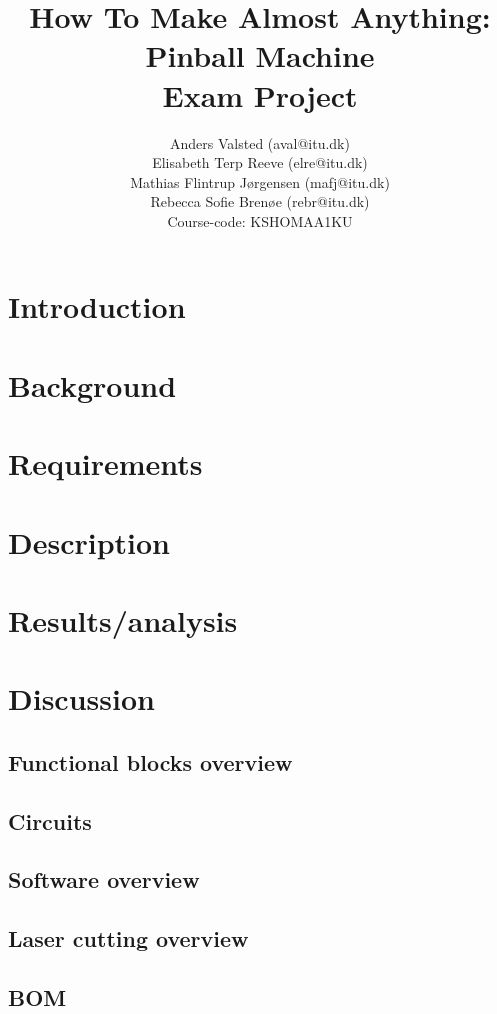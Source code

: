 \documentclass{IEEEtran}
\title{
	\textbf{How To Make Almost Anything:\\ Pinball Machine } \\
	Exam Project 
}
\author{
	Anders Valsted (aval@itu.dk) \\
	Elisabeth Terp Reeve (elre@itu.dk) \\
	Mathias Flintrup Jørgensen (mafj@itu.dk) \\
	Rebecca Sofie Brenøe (rebr@itu.dk) \\[6pt]
	{\small Course-code: KSHOMAA1KU }
}
\begin{document}
\maketitle
\newpage

\section{Introduction}\label{intro}

\section{Background}\label{background}

\section{Requirements}\label{requirements}

\section{Description}\label{description}

\section{Results/analysis}\label{analysis}

\section{Discussion}\label{discussion}




\newpage
\appendix
\subsection{Functional blocks overview}

\subsection{Circuits}

\subsection{Software overview}
 \label{appendix:programming model}
\subsection{Laser cutting overview}

\subsection{BOM}

\end{document}
